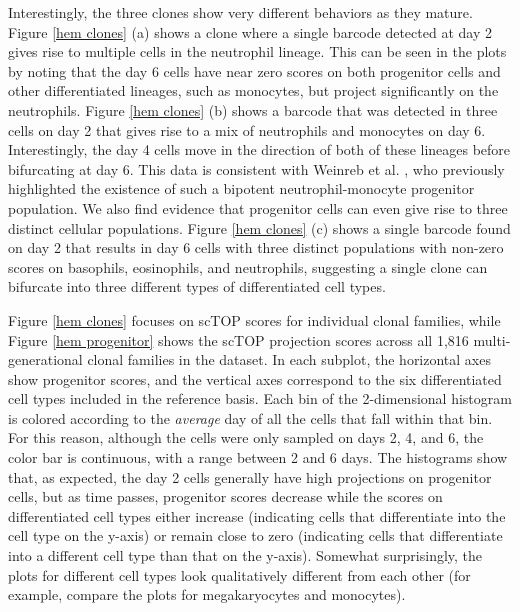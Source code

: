 \documentclass[aps,superscriptaddress, notitlepage,longbibliography]{revtex4-1}
\begin{document}
Interestingly, the three clones show very different behaviors as they mature. Figure \ref{hem clones} (a) shows a clone where a single barcode detected at day 2 gives rise to multiple cells in the neutrophil lineage. This can be seen in the plots by noting that the day 6 cells have near zero scores on both progenitor cells and other differentiated lineages, such as monocytes, but project significantly on the neutrophils. Figure \ref{hem clones} (b) shows a barcode that was detected in three cells on day 2 that gives rise to a mix of neutrophils and monocytes on day 6. Interestingly, the day 4 cells move in the direction of both of these lineages before bifurcating at day 6. This data is consistent with Weinreb et al. \cite{weinreb_lineage_2020}, who previously highlighted the existence of such a bipotent neutrophil-monocyte progenitor population. We also find evidence that progenitor cells can even give rise to three distinct cellular populations. Figure \ref{hem clones} (c) shows a single barcode found on day 2 that results in day 6 cells with three distinct populations with non-zero scores on basophils, eosinophils, and neutrophils, suggesting a single clone can bifurcate into three different types of differentiated cell types.

Figure \ref{hem clones} focuses on scTOP scores for individual clonal families, while Figure \ref{hem progenitor} shows the scTOP projection scores across all 1,816 multi-generational clonal families in the dataset. In each subplot, the horizontal axes show progenitor scores, and the vertical axes correspond to the six differentiated cell types included in the reference basis. Each bin of the 2-dimensional histogram is colored according to the {\it average} day of all the cells that fall within that bin. For this reason, although the cells were only sampled on days 2, 4, and 6, the color bar is continuous, with a range between 2 and 6 days. The histograms show that, as expected, the day 2 cells generally have high projections on progenitor cells, but as time passes, progenitor scores decrease while the scores on differentiated cell types either increase (indicating cells that differentiate into the cell type on the y-axis) or remain close to zero (indicating cells that differentiate into a different cell type than that on the y-axis). Somewhat surprisingly, the plots for different cell types look qualitatively different from each other (for example, compare the plots for megakaryocytes and monocytes). 
\end{document}
